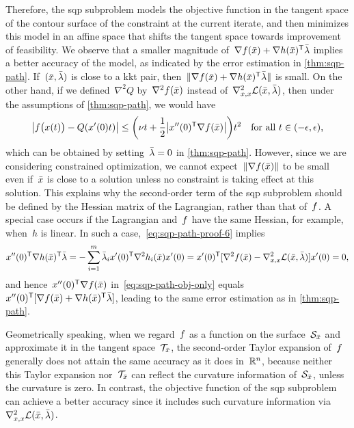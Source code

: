 Therefore, the \gls{sqp} subproblem models the objective function in the tangent space of the contour surface of the constraint at the current iterate, and then minimizes this model in an affine space that shifts the tangent space towards improvement of feasibility.
We observe that a smaller magnitude of~$\nabla \obj(\bar{\iter}) + \nabla h(\bar{\iter})^{\T} \bar{\lm}$ implies a better accuracy of the model, as indicated by the error estimation in \cref{thm:sqp-path}.
If~$(\bar{\iter}, \bar{\lm})$ is close to a \gls{kkt} pair, then~$\norm{\nabla \obj(\bar{\iter}) + \nabla h(\bar{\iter})^{\T} \bar{\lm}}$ is small.
On the other hand, if we defined~$\nabla^2 Q$ by~$\nabla^2 \obj(\bar{\iter})$ instead of~$\nabla_{x, x}^2 \lag(\bar{\iter}, \bar{\lm})$, then under the assumptions of \cref{thm:sqp-path}, we would have
\begin{equation}
    \label{eq:sqp-path-obj-only}
    \abs[\big]{\obj \big( \iter(t) \big) - Q(x'(0) t)} \le \bigg( \nu t + \frac{1}{2} \abs[\big]{\iter''(0)^{\T} \nabla \obj(\bar{\iter})} \bigg) t^2 \quad \text{for all~$t \in (-\epsilon, \epsilon)$,}
\end{equation}
which can be obtained by setting~$\bar{\lm} = 0$ in \cref{thm:sqp-path}.
However, since we are considering constrained optimization, we cannot expect~$\norm{\nabla \obj(\bar{\iter})}$ to be small even if~$\bar{\iter}$ is close to a solution unless no constraint is taking effect at this solution.
This explains why the second-order term of the \gls{sqp} subproblem should be defined by the Hessian matrix of the Lagrangian, rather than that of~$f$.
A special case occurs if the Lagrangian and~$f$ have the same Hessian, for example, when~$h$ is linear.
In such a case,~\cref{eq:sqp-path-proof-6} implies
\begin{equation*}
    \iter''(0)^{\T} \nabla h(\bar{\iter})^{\T} \bar{\lm} = -\sum_{i = 1}^m \bar{\lm}_i \iter'(0)^{\T} \nabla^2 h_i(\bar{\iter}) \iter'(0) = \iter'(0)^{\T} [\nabla^2 \obj(\bar{\iter}) - \nabla_{x, x}^2 \lag(\bar{\iter}, \bar{\lm})] \iter'(0) = 0,
\end{equation*}
and hence~$\iter''(0)^{\T} \nabla \obj(\bar{\iter})$ in~\cref{eq:sqp-path-obj-only} equals~$\iter''(0)^{\T} [\nabla \obj(\bar{\iter}) + \nabla h(\bar{\iter})^{\T} \bar{\lm}]$, leading to the same error estimation as in \cref{thm:sqp-path}.

Geometrically speaking, when we regard~$f$ as a function on the surface~$\mathcal{S}_{\bar{\iter}}$ and approximate it in the tangent space~$\mathcal{T}_{\bar{\iter}}$, the second-order Taylor expansion of~$f$ generally does not attain the same accuracy as it does in~$\mathbb{R}^n$, because neither this Taylor expansion nor~$\mathcal{T}_{\bar{\iter}}$ can reflect the curvature information
of~$\mathcal{S}_{\bar{\iter}}$, unless the curvature is zero.
In contrast, the objective function of the \gls{sqp} subproblem can achieve a better accuracy since it includes such curvature information via~$\nabla_{x, x}^2 \lag(\bar{\iter}, \bar{\lm})$.

